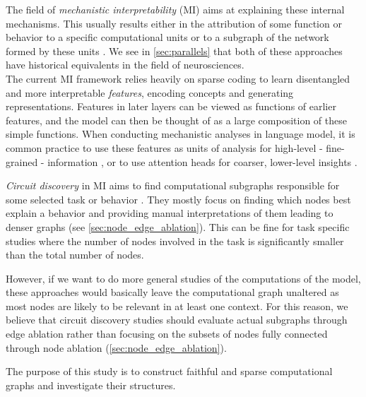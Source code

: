\documentclass{article}
\begin{document}
The field of \textit{mechanistic interpretability} (MI) aims at explaining these internal mechanisms. This usually results either in the attribution of some function or behavior to a specific computational units \citep{mallen2024elicitinglatentknowledgequirky, marks2023geometrytruthemergentlinear, lu2019checking} or to a subgraph of the network formed by these units \citep{conmy2023automatedACDCCircuits, merullo2024talking}. We see in \cref{sec:parallels} that both of these approaches have historical equivalents in the field of neurosciences.\\

The current MI framework relies heavily on sparse coding to learn disentangled and more interpretable \textit{features}, encoding concepts and generating representations. Features in later layers can be viewed as functions of earlier features, and the model can then be thought of as a large composition of these simple functions. When conducting mechanistic analyses in language model, it is common practice to use these features as units of analysis for high-level - fine-grained - information \citep{marks2024sparseCircuits}, or to use attention heads for coarser, lower-level insights \citep{conmy2023automatedACDCCircuits,syed2023attributionCircuits}.

\textit{Circuit discovery} in MI aims to find computational subgraphs responsible for some selected task or behavior \citep{conmy2023automatedACDCCircuits, syed2023attributionCircuits, oneill2024sparse, he2024dictionaryCircuits}. They mostly focus on finding which nodes best explain a behavior and providing manual interpretations of them \citep{marks2024sparseCircuits, conmy2023automatedACDCCircuits} leading to denser graphs (see \cref{sec:node_edge_ablation}). This can be fine for task specific studies where the number of nodes involved in the task is significantly smaller than the total number of nodes.

However, if we want to do more general studies of the computations of the model, these approaches would basically leave the computational graph unaltered as most nodes are likely to be relevant in at least one context. For this reason, we believe that circuit discovery studies should evaluate actual subgraphs through edge ablation rather than focusing on the subsets of nodes fully connected through node ablation (\cref{sec:node_edge_ablation}).

The purpose of this study is to construct faithful and sparse computational graphs and investigate their structures.\\
\end{document}
